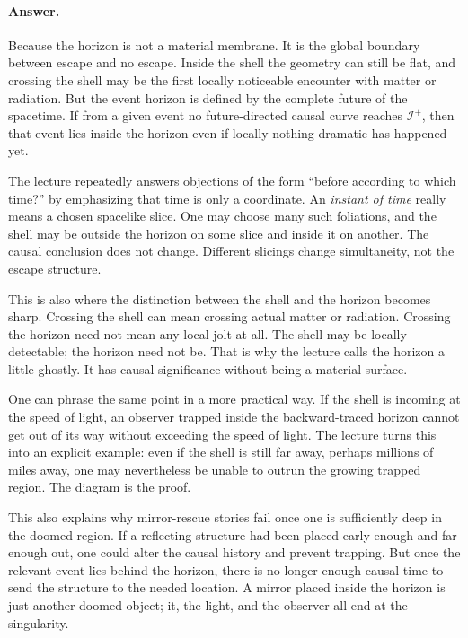 \paragraph{Answer.} Because the horizon is not a material membrane. It is the global boundary between escape and no escape. Inside the shell the geometry can still be flat, and crossing the shell may be the first locally noticeable encounter with matter or radiation. But the event horizon is defined by the complete future of the spacetime. If from a given event no future-directed causal curve reaches \(\mathscr I^+\), then that event lies inside the horizon even if locally nothing dramatic has happened yet.

The lecture repeatedly answers objections of the form ``before according to which time?'' by emphasizing that time is only a coordinate. An \emph{instant of time} really means a chosen spacelike slice. One may choose many such foliations, and the shell may be outside the horizon on some slice and inside it on another. The causal conclusion does not change. Different slicings change simultaneity, not the escape structure.

This is also where the distinction between the shell and the horizon becomes sharp. Crossing the shell can mean crossing actual matter or radiation. Crossing the horizon need not mean any local jolt at all. The shell may be locally detectable; the horizon need not be. That is why the lecture calls the horizon a little ghostly. It has causal significance without being a material surface.

One can phrase the same point in a more practical way. If the shell is incoming at the speed of light, an observer trapped inside the backward-traced horizon cannot get out of its way without exceeding the speed of light. The lecture turns this into an explicit example: even if the shell is still far away, perhaps millions of miles away, one may nevertheless be unable to outrun the growing trapped region. The diagram is the proof.

This also explains why mirror-rescue stories fail once one is sufficiently deep in the doomed region. If a reflecting structure had been placed early enough and far enough out, one could alter the causal history and prevent trapping. But once the relevant event lies behind the horizon, there is no longer enough causal time to send the structure to the needed location. A mirror placed inside the horizon is just another doomed object; it, the light, and the observer all end at the singularity.

